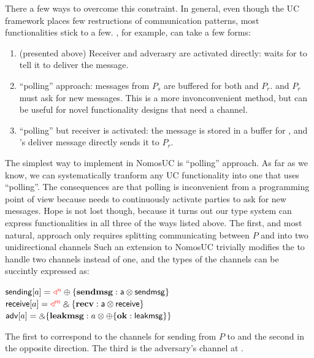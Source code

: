 There a few ways to overcome this constraint. 
In general, even though the UC framework places few restructions of communication patterns, most functionalities stick to a few.
\Fauth, for example, can take a few forms:
\begin{enumerate}
\item (presented above) Receiver and adverasry are activated directly: \Fauth waits for \A to tell it to deliver the message.
\item \Fauth ``polling'' approach: messages from $P_s$ are buffered for both \A and $P_r$. \A and $P_r$ must ask \Fauth for new messages. This is a more invonconvenient method, but can be useful for novel functionality designs that need a channel.
\item ``polling'' but receiver is activated: the message is stored in a buffer for \A, and \A's deliver message directly sends it to $P_r$.
\end{enumerate}
The simplest way to implement \Fauth in NomosUC is ``polling'' approach. As far as we know, we can systematically tranform any UC functionality into one that uses ``polling''. 
The consequences are that polling is inconvenient from a programming point of view because \Z needs to continuously activate parties to ask for new messages.
Hope is not lost though, because it turns out our type system can express functionalities in all three of the ways listed above. 
The first, and most natural, approach only requires splitting communicating between $P$ and \Fauth into two unidirectional channels
Such an extension to NomosUC trivially modifies the \partywrapper to handle two channels instead of one, and the types of the channels can be succintly expressed as: 
\begin{center}
\parbox{0cm}{
\begin{tabbing}
$\mathsf{sending}[a] = \textcolor{red}{\triangleleft^n} \oplus \{ \mathbf{sendmsg}: \mathsf{a} \otimes \mathsf{sendmsg} \}$ \\
$\mathsf{receive}[a] = \textcolor{red}{\triangleleft^m} \mathbin{\binampersand} \{ \mathbf{recv}: \mathsf{a} \otimes \mathsf{receive} \}$ \\
$\mathsf{adv}[a] = \mathbin{\binampersand} \{ \mathbf{leakmsg}: a \otimes \oplus \{  \mathbf{ok}: \mathsf{leakmsg} \} \}$
\end{tabbing}}
\end{center}
The first to correspond to the channels for sending from $P$ to \Fauth and the second in the opposite direction. The third is the adversary's channel at \Fauth.

